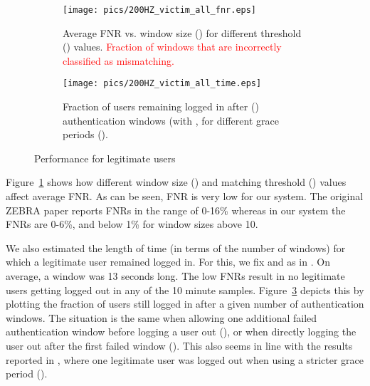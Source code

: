 \documentclass[conference]{IEEEtran}
\newcommand{\zebra}{ZEBRA\xspace}
\newif\ifllncs
\newcommand\changeMika[1]{\textcolor{red}{#1}}
\newcommand\changeMika[1]{{#1}}
\begin{document}
\ifllncs
\begin{figure}
\centering
\begin{subfigure}{.5\textwidth}
  \centering
  \texttt{[image: pics/200HZ\_victim\_all\_fnr.eps]}
\caption{}
  \label{fig:victim_fnr}
\end{subfigure}\begin{subfigure}{.5\textwidth}
  \centering
  \texttt{[image: pics/200HZ\_victim\_all\_time.eps]}
\caption{}
  \label{fig:victim_time}
\end{subfigure}
\caption{Performance for legitimate users: \textbf{(a)} Average FNR for different threshold ()values. \textbf{(b)} Fraction of users remaining logged in after () authentication windows (with , for different grace periods ().}
\end{figure}

\else

\begin{figure}[bh!]
	\centering
	\begin{subfigure}[b]{1\linewidth}
	\centering
		\texttt{[image: pics/200HZ\_victim\_all\_fnr.eps]}
		\caption{Average FNR vs. window size () for different threshold () values. \changeMika{Fraction of windows that are incorrectly classified as mismatching.}}
		\label{fig:victim_fnr}
	\end{subfigure}

	\begin{subfigure}[b]{1\linewidth}
	\centering
		\texttt{[image: pics/200HZ\_victim\_all\_time.eps]}
		\caption{Fraction of users remaining logged in after () authentication windows (with , for different grace periods ().}
		\label{fig:victim_time}
	\end{subfigure}
	\caption{Performance for legitimate users}
\end{figure}

\fi



Figure~\ref{fig:victim_fnr} shows how different window size () and matching threshold () values affect average FNR. 
As can be seen, FNR is very low for our system. The original \zebra paper \cite{mare2014zebra} reports FNRs in the range of 0-16\% whereas in our system the FNRs are 0-6\%, and below 1\% for window sizes above 10. 

We also estimated the length of time (in terms of the number of windows) for which a legitimate user remained logged in. For this, we fix  and  as in \cite{mare2014zebra}. On average, a window was 13 seconds long. The low FNRs result in no legitimate users getting logged out in any of the 10 minute samples. Figure~\ref{fig:victim_time} depicts this by plotting the fraction of users still logged in after a given number of authentication windows. The situation is the same when allowing one additional failed authentication window before logging a user out (), or when directly logging the user out after the first failed window (). This also seems in line with the results reported in \cite{mare2014zebra}, where one legitimate user was logged out when using a stricter grace period (). 
\end{document}
